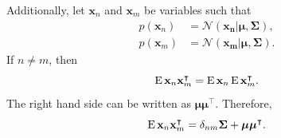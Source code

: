Additionally, let $\mathbf{x}_n$ and $\mathbf{x}_m$ be variables such that
%
\begin{equation}
\begin{aligned}
p(\mathbf{x}_n)
&=
\mathcal{N}
\left(
	\mathbf{x_n}
	|
	\bm{\mu},
	\bm{\Sigma}
\right), 
\\
p(\mathbf{x}_m)
&=
\mathcal{N}
\left(
	\mathbf{x_m}
	|
	\bm{\mu},
	\bm{\Sigma}
\right).
\end{aligned}
\end{equation}
%
If $n \neq m$, then
%
\begin{equation}
\operatorname{E} \mathbf{x}_n \mathbf{x}_m ^ \intercal
= 
\operatorname{E} \mathbf{x}_n 
\operatorname{E} \mathbf{x}_m ^ \intercal.
\end{equation}
%
The right hand side can be written as $\bm{\mu} \bm{\mu} ^ \intercal$.
Therefore,
%
\begin{equation}
\operatorname{E} \mathbf{x}_n \mathbf{x}_m ^ \intercal
=
\delta_{nm} 
\bm{\Sigma} 
+ 
\bm{\mu} 
\bm{\mu} ^ \intercal.
\end{equation}
%

